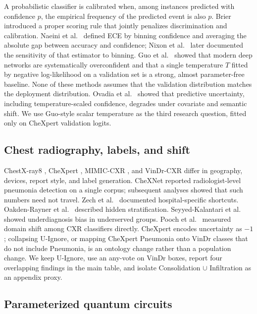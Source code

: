 \documentclass{midl} %
\begin{document}
A probabilistic classifier is calibrated when, among instances predicted with confidence $p$, the empirical frequency of the predicted event is also $p$. Brier \cite{brier1950verification} introduced a proper scoring rule that jointly penalizes discrimination and calibration. Naeini et al.\ \cite{naeini2015ece} defined ECE by binning confidence and averaging the absolute gap between accuracy and confidence; Nixon et al.\ \cite{nixon2019measuring} later documented the sensitivity of that estimator to binning. Guo et al.\ \cite{guo2017calibration} showed that modern deep networks are systematically overconfident and that a single temperature $T$ fitted by negative log-likelihood on a validation set is a strong, almost parameter-free baseline. None of these methods assumes that the validation distribution matches the deployment distribution. Ovadia et al.\ \cite{ovadia2019shift} showed that predictive uncertainty, including temperature-scaled confidence, degrades under covariate and semantic shift. We use Guo-style scalar temperature as the third research question, fitted only on CheXpert validation logits.

\subsection{Chest radiography, labels, and shift}

ChestX-ray8 \cite{wang2017chestxray8}, CheXpert \cite{irvin2019chexpert}, MIMIC-CXR \cite{johnson2019mimiccxr}, and VinDr-CXR \cite{nguyen2022vindrcxr} differ in geography, devices, report style, and label generation. CheXNet \cite{rajpurkar2017chexnet} reported radiologist-level pneumonia detection on a single corpus; subsequent analyses showed that such numbers need not travel. Zech et al.\ \cite{zech2018variable} documented hospital-specific shortcuts. Oakden-Rayner et al.\ \cite{oakden2020hidden} described hidden stratification. Seyyed-Kalantari et al.\ \cite{seyyed2021underdiagnosis} showed underdiagnosis bias in underserved groups. Pooch et al.\ \cite{pooch2020shift} measured domain shift among CXR classifiers directly. CheXpert encodes uncertainty as $-1$; collapsing U-Ignore, or mapping CheXpert Pneumonia onto VinDr classes that do not include Pneumonia, is an ontology change rather than a population change. We keep U-Ignore, use an any-vote on VinDr boxes, report four overlapping findings in the main table, and isolate Consolidation $\cup$ Infiltration as an appendix proxy.

\subsection{Parameterized quantum circuits}
\end{document}
